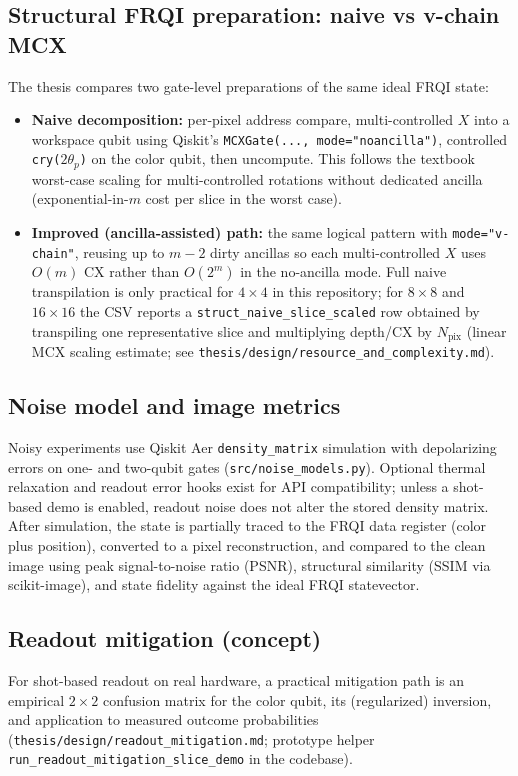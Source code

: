 \subsection{Structural FRQI preparation: naive vs v-chain MCX}
The thesis compares two gate-level preparations of the same ideal FRQI state:
\begin{itemize}
  \item \textbf{Naive decomposition:} per-pixel address compare, multi-controlled $X$ into a workspace qubit using Qiskit's \texttt{MCXGate(..., mode="noancilla")}, controlled \texttt{cry($2\theta_p$)} on the color qubit, then uncompute. This follows the textbook worst-case scaling for multi-controlled rotations without dedicated ancilla (exponential-in-$m$ cost per slice in the worst case).
  \item \textbf{Improved (ancilla-assisted) path:} the same logical pattern with \texttt{mode="v-chain"}, reusing up to $m-2$ dirty ancillas so each multi-controlled $X$ uses $O(m)$ CX rather than $O(2^m)$ in the no-ancilla mode. Full naive transpilation is only practical for $4\times 4$ in this repository; for $8\times 8$ and $16\times 16$ the CSV reports a \texttt{struct\_naive\_slice\_scaled} row obtained by transpiling one representative slice and multiplying depth/CX by $N_{\mathrm{pix}}$ (linear MCX scaling estimate; see \texttt{thesis/design/resource\_and\_complexity.md}).
\end{itemize}

\subsection{Noise model and image metrics}
Noisy experiments use Qiskit Aer \texttt{density\_matrix} simulation with depolarizing errors on one- and two-qubit gates (\texttt{src/noise\_models.py}). Optional thermal relaxation and readout error hooks exist for API compatibility; unless a shot-based demo is enabled, readout noise does not alter the stored density matrix. After simulation, the state is partially traced to the FRQI data register (color plus position), converted to a pixel reconstruction, and compared to the clean image using peak signal-to-noise ratio (PSNR), structural similarity (SSIM via scikit-image), and state fidelity against the ideal FRQI statevector.

\subsection{Readout mitigation (concept)}
For shot-based readout on real hardware, a practical mitigation path is an empirical $2\times 2$ confusion matrix for the color qubit, its (regularized) inversion, and application to measured outcome probabilities (\texttt{thesis/design/readout\_mitigation.md}; prototype helper \texttt{run\_readout\_mitigation\_slice\_demo} in the codebase).

